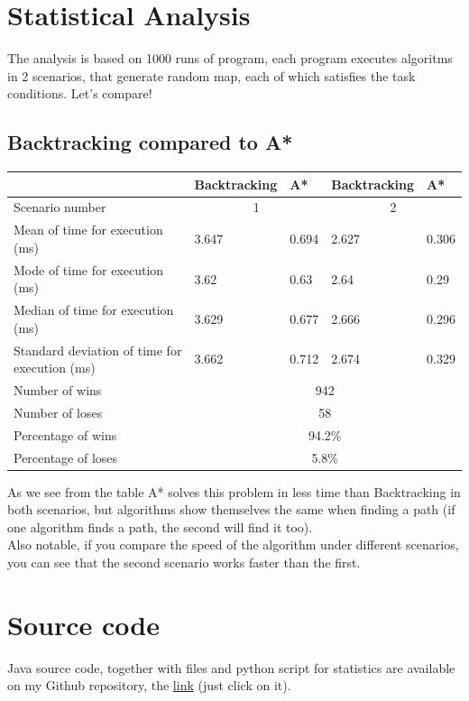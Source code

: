 \documentclass[a4paper]{article}
\begin{document}
\section{Statistical Analysis}
The analysis is based on 1000 runs of program, each program executes algoritms in 2 scenarios, that generate random map, each of which satisfies the task conditions. Let's compare!
\subsection*{Backtracking compared to A*} 

\begin{center}
\begin{tabular}{ |p{5cm}|p{2cm}|p{2cm}|p{2cm}|p{2cm}| }
    \hline
    & Backtracking&A*&Backtracking&A*\\
    \hline
    Scenario number&\multicolumn{2}{|c|}{1} & \multicolumn{2}{|c|}{2}\\
    \hline
    Mean of time for execution (ms)& 3.647 & 0.694 &2.627& 0.306\\
    Mode of time for execution (ms) & 3.62  & 0.63&2.64& 0.29\\
    Median of time for execution (ms)& 3.629 & 0.677&2.666& 0.296\\
    Standard deviation of time for execution (ms) & 3.662 & 0.712&2.674& 0.329\\
    \hline
    Number of wins & \multicolumn{4}{|c|}{942} \\
    Number of loses & \multicolumn{4}{|c|}{58}  \\
    Percentage of wins & \multicolumn{4}{|c|}{94.2\%} \\
    Percentage of loses & \multicolumn{4}{|c|}{5.8\%} \\
    \hline
\end{tabular}
\end{center}
As we see from the table A* solves this problem in less time than Backtracking in both scenarios, but algorithms show themselves the same when finding a path (if one algorithm finds a path, the second will find it too).\\
Also notable, if you compare the speed of the algorithm under different scenarios, you can see that the second scenario works faster than the first.

\section{Source code}
Java source code, together with files and python script for statistics are available on my Github repository, the \href{https://github.com/NAD777/AI-assignment-1}{link} (just click on it).
\end{document}
